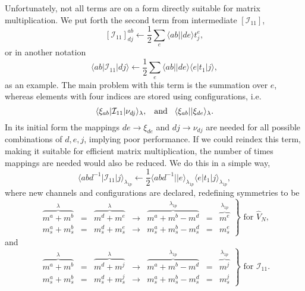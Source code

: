 Unfortunately, not all terms are on a form directly suitable for matrix multiplication.
We put forth the second term from intermediate $\left[\mathcal{I}_{11}\right]$,
\begin{equation}
\left[\mathcal{I}_{11}\right]_{dj}^{ab} \leftarrow \frac{1}{2} \sum_{e} \langle ab||de \rangle  t_j^e ,
\end{equation}
or in another notation
\begin{equation}
\langle ab | \mathcal{I}_{11} | dj \rangle \leftarrow \frac{1}{2} \sum_{e} \langle ab||de \rangle \langle e | t_1 | j \rangle ,
\end{equation}
as an example.
The main problem with this term is the summation over $e$, whereas elements with four indices are stored using configurations, i.e.
\begin{equation}
\langle \xi_{ab} | \mathcal{I}_{11} | \nu_{dj} \rangle_{\lambda} ,
\textrm{\hspace{3mm}and\hspace{3mm}}
\langle \xi_{ab}||\xi_{de} \rangle_{\lambda} .
\end{equation}
In its initial form the mappings $de \rightarrow \xi_{de}$ and $dj \rightarrow \nu_{dj}$ are needed for all possible combinations of $d,e,j$, implying poor performance.
If we could reindex this term, making it suitable for efficient matrix multiplication, the number of times mappings are needed would also be reduced.
We do this in a simple way,
\begin{equation}
\langle abd^{-1} | \mathcal{I}_{11} | j \rangle_{\lambda_{1p}} \leftarrow \frac{1}{2}
\langle abd^{-1} || e \rangle_{\lambda_{1p}} \langle e |t_1|j\rangle_{\lambda_{1p}} ,
\end{equation}
where new channels and configurations are declared, redefining symmetries to be 
\begin{equation}
\left.
\begin{array}{ccccccc}
\overbrace{m^a + m^b}^{\lambda} 
&=&
\overbrace{m^d + m^e}^{\lambda} 
& \rightarrow &
\overbrace{m^a + m^b - m^d}^{\lambda_{1p}} 
&=&
\overbrace{m^e}^{\lambda_{1p}} \\
m_s^a + m_s^b 
&=& 
m_s^d + m_s^e 
&\rightarrow & 
m_s^a + m_s^b - m_s^d 
&=&
m_s^e 
\end{array}
\right\rbrace \textrm{ for } \hat{V}_{N}, 
\end{equation}
and
\begin{equation}
\left.
\begin{array}{ccccccc}
\overbrace{m^a + m^b}^{\lambda} 
&=&
\overbrace{m^d + m^j}^{\lambda} 
& \rightarrow &
\overbrace{m^a + m^b - m^d}^{\lambda_{1p}} 
&=&
\overbrace{m^j}^{\lambda_{1p}} \\
m_s^a + m_s^b 
&=& 
m_s^d + m_s^j 
&\rightarrow & 
m_s^a + m_s^b - m_s^d 
&=&
m_s^j 
\end{array}
\right\rbrace \textrm{ for } \mathcal{I}_{11} .
\end{equation}
